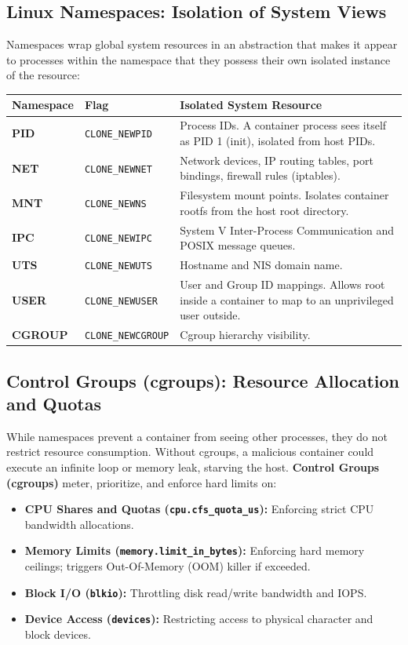 \documentclass[11pt,a4paper,openany]{report}
\begin{document}
\subsection{Linux Namespaces: Isolation of System Views}
Namespaces wrap global system resources in an abstraction that makes it appear to processes within the namespace that they possess their own isolated instance of the resource:
\begin{center}
\begin{tabularx}{\textwidth}{>{\bfseries}l l X}
\toprule
Namespace & Flag & Isolated System Resource\\
\midrule
PID & \texttt{CLONE\_NEWPID} & Process IDs. A container process sees itself as PID 1 (init), isolated from host PIDs.\\
NET & \texttt{CLONE\_NEWNET} & Network devices, IP routing tables, port bindings, firewall rules (iptables).\\
MNT & \texttt{CLONE\_NEWNS} & Filesystem mount points. Isolates container rootfs from the host root directory.\\
IPC & \texttt{CLONE\_NEWIPC} & System V Inter-Process Communication and POSIX message queues.\\
UTS & \texttt{CLONE\_NEWUTS} & Hostname and NIS domain name.\\
USER & \texttt{CLONE\_NEWUSER} & User and Group ID mappings. Allows root inside a container to map to an unprivileged user outside.\\
CGROUP & \texttt{CLONE\_NEWCGROUP} & Cgroup hierarchy visibility.\\
\bottomrule
\end{tabularx}
\end{center}

\subsection{Control Groups (cgroups): Resource Allocation and Quotas}
While namespaces prevent a container from seeing other processes, they do not restrict resource consumption. Without cgroups, a malicious container could execute an infinite loop or memory leak, starving the host. \textbf{Control Groups (cgroups)} meter, prioritize, and enforce hard limits on:
\begin{itemize}[leftmargin=*]
  \item \textbf{CPU Shares and Quotas (\texttt{cpu.cfs\_quota\_us}):} Enforcing strict CPU bandwidth allocations.
  \item \textbf{Memory Limits (\texttt{memory.limit\_in\_bytes}):} Enforcing hard memory ceilings; triggers Out-Of-Memory (OOM) killer if exceeded.
  \item \textbf{Block I/O (\texttt{blkio}):} Throttling disk read/write bandwidth and IOPS.
  \item \textbf{Device Access (\texttt{devices}):} Restricting access to physical character and block devices.
\end{itemize}
\end{document}
